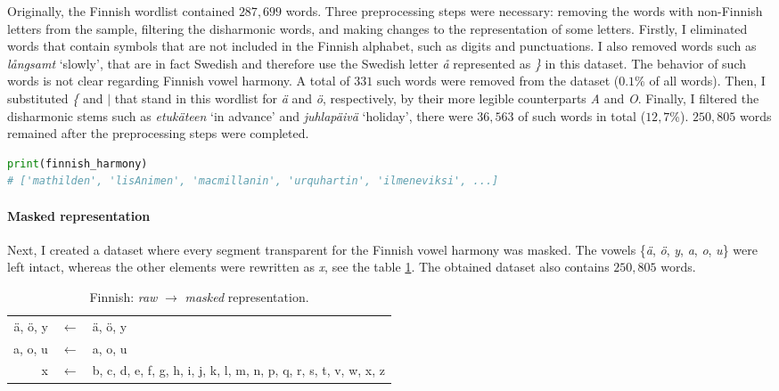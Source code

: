 Originally, the Finnish wordlist contained $287,699$ words.
Three preprocessing steps were necessary: removing the words with non-Finnish letters from the sample, filtering the disharmonic words, and making changes to the representation of some letters.
Firstly, I eliminated words that contain symbols that are not included in the Finnish alphabet, such as digits and punctuations.
I also removed words such as \emph{l\r{a}ngsamt} `slowly', that are in fact Swedish and therefore use the Swedish letter \emph{\r{a}} represented as \emph{\}} in this dataset.
The behavior of such words is not clear regarding Finnish vowel harmony.
A total of $331$ such words were removed from the dataset ($0.1$\% of all words).
Then, I substituted \emph{\{} and \emph{$\mid$} that stand in this wordlist for \emph{\"a} and \emph{\"o}, respectively, by their more legible counterparts \emph{A} and \emph{O}.
Finally, I filtered the disharmonic stems such as \emph{etuk\"ateen} `in advance' and \emph{juhlap\"aiv\"a} `holiday', there were $36,563$ of such words in total ($12,7$\%).
$250,805$ words remained after the preprocessing steps were completed.

\begin{lstlisting}[language=Python]
print(finnish_harmony)
# ['mathilden', 'lisAnimen', 'macmillanin', 'urquhartin', 'ilmeneviksi', ...]
\end{lstlisting}


\paragraph{Masked representation}

Next, I created a dataset where every segment transparent for the Finnish vowel harmony was masked.
The vowels \{\emph{\"a}, \emph{\"o}, \emph{y}, \emph{a}, \emph{o}, \emph{u}\} were left intact, whereas the other elements were rewritten as \emph{x}, see the table \ref{finnishmap1}.
The obtained dataset also contains $250,805$ words.

\begin{table}[h!]
\begin{center}
\begin{tabular}{rcl}
\"a, \"o, y & $\leftarrow$ & \"a, \"o, y \\
a, o, u & $\leftarrow$ & a, o, u \\
x & $\leftarrow$ & b, c, d, e, f, g, h, i, j, k, l, m, n, p, q, r, s, t, v, w, x, z
\end{tabular}
\end{center}
\caption{Finnish: \emph{raw} $\rightarrow$ \emph{masked} representation.}
\label{finnishmap1}
\end{table}

